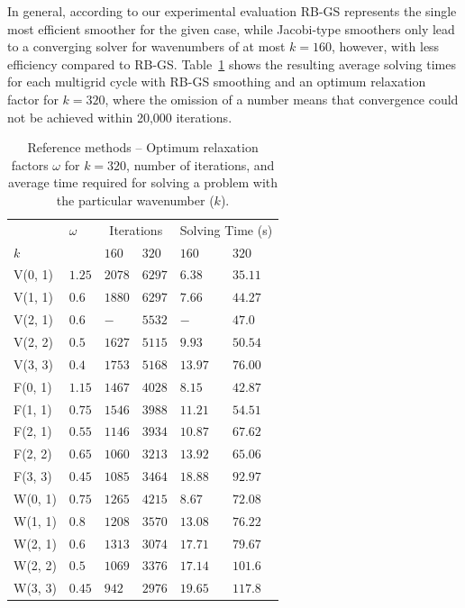 In general, according to our experimental evaluation RB-GS represents the single most efficient smoother for the given case, while Jacobi-type smoothers only lead to a converging solver for wavenumbers of at most $k = 160$, however, with less efficiency compared to RB-GS.
Table~\ref{table:reference-methods-helmholtz} shows the resulting average solving times for each multigrid cycle with RB-GS smoothing and an optimum relaxation factor for $k = 320$, where the omission of a number means that convergence could not be achieved within 20,000 iterations. 
\begin{table}
	\caption[2D Helmholtz -- Number of iterations and solving time of the reference methods]{Reference methods -- Optimum relaxation factors $\omega$ for $k = 320$, number of iterations, and average time required for solving a problem with the particular wavenumber ($k$).}
	\label{table:reference-methods-helmholtz}
	\centering
	\begin{tabular}{l l l l l l}
		\toprule
		& $\omega$ & \multicolumn{2}{c}{Iterations} & \multicolumn{2}{c}{Solving Time (s)} \\
		\cmidrule(r){3-4} \cmidrule(r){5-6}
		$k$ & & $160$ & $320$ & $160$ & $320$ \\
		\midrule
		V(0, 1) & $1.25$ & $2078$ & $6297$ & $6.38$ & $35.11$ \\
		\midrule
		V(1, 1) & $0.6$ & $1880$ & $6297$ & $7.66$ & $44.27$ \\
		\midrule
		V(2, 1) & $0.6$ & $-$ & $5532$ & $-$ & $47.0$ \\
		\midrule
		V(2, 2) & $0.5$ & $1627$ & $5115$ & $9.93$ & $50.54$  \\
		\midrule
		V(3, 3) & $0.4$ & $1753$ & $5168$ & $13.97$ & $76.00$ \\
		\midrule
		F(0, 1) & $1.15$ & $1467$ & $4028$ & $8.15$ & $42.87$  \\
		\midrule
		F(1, 1) & $0.75$ & $1546$ & $3988$ & $11.21$ & $54.51$ \\
		\midrule
		F(2, 1) & $0.55$ & $1146$ & $3934$ & $10.87$ & $67.62$ \\
		\midrule
		F(2, 2) & $0.65$ & $1060$ & $3213$ & $13.92$ & $65.06$ \\
		\midrule
		F(3, 3) & $0.45$ & $1085$ & $3464$ & $18.88$ & $92.97$ \\
		\midrule
		W(0, 1) & $0.75$ & $1265$ & $4215$ & $8.67$ & $72.08$ \\
		\midrule
		W(1, 1) & $0.8$ & $1208$ & $3570$ & $13.08$ & $76.22$ \\
		\midrule
		W(2, 1) & $0.6$ & $1313$ & $3074$ & $17.71$ & $79.67$ \\
		\midrule
		W(2, 2) & $0.5$ & $1069$ & $3376$ & $17.14$ & $101.6$ \\
		\midrule
		W(3, 3) & $0.45$ & $942$ & $2976$ & $19.65$ & $117.8$ \\
		\bottomrule
	\end{tabular}
\end{table}
